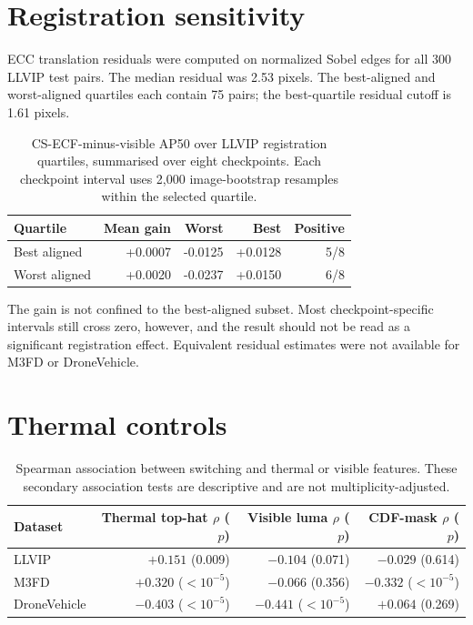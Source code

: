 \documentclass[11pt]{article}
\begin{document}
\section{Registration sensitivity}

ECC translation residuals were computed on normalized Sobel edges for all 300
LLVIP test pairs. The median residual was 2.53 pixels. The best-aligned and
worst-aligned quartiles each contain 75 pairs; the best-quartile residual
cutoff is 1.61 pixels.

\begin{table}[h]
\centering
\small
\caption{CS-ECF-minus-visible AP50 over LLVIP registration quartiles, summarised
over eight checkpoints. Each checkpoint interval uses 2,000 image-bootstrap
resamples within the selected quartile.}
\label{tab:alignment}
\begin{tabular}{@{}lrrrr@{}}
\toprule
Quartile & Mean gain & Worst & Best & Positive \\
\midrule
Best aligned & +0.0007 & -0.0125 & +0.0128 & 5/8 \\
Worst aligned & +0.0020 & -0.0237 & +0.0150 & 6/8 \\
\bottomrule
\end{tabular}
\end{table}

The gain is not confined to the best-aligned subset. Most checkpoint-specific
intervals still cross zero, however, and the result should not be read as a
significant registration effect. Equivalent residual estimates were not
available for M3FD or DroneVehicle.

\section{Thermal controls}

\begin{table}[h]
\centering
\small
\caption{Spearman association between switching and thermal or visible
features. These secondary association tests are descriptive and are not
multiplicity-adjusted.}
\begin{tabular}{@{}lrrr@{}}
\toprule
Dataset & Thermal top-hat \(\rho\) (\(p\)) & Visible luma \(\rho\) (\(p\)) &
CDF-mask \(\rho\) (\(p\)) \\
\midrule
LLVIP & \(+0.151\) (0.009) & \(-0.104\) (0.071) & \(-0.029\) (0.614) \\
M3FD & \(+0.320\) (\(<10^{-5}\)) & \(-0.066\) (0.356) & \(-0.332\) (\(<10^{-5}\)) \\
DroneVehicle & \(-0.403\) (\(<10^{-5}\)) & \(-0.441\) (\(<10^{-5}\)) & \(+0.064\) (0.269) \\
\bottomrule
\end{tabular}
\end{table}
\end{document}
